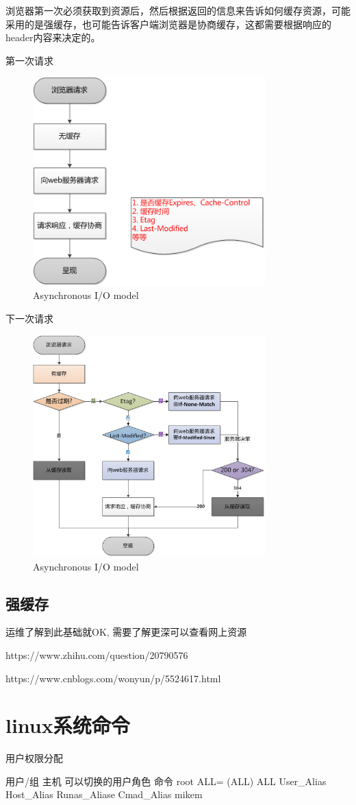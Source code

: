 浏览器第一次必须获取到资源后，然后根据返回的信息来告诉如何缓存资源，可能采用的是强缓存，也可能告诉客户端浏览器是协商缓存，这都需要根据响应的header内容来决定的。

第一次请求

\begin{figure}[!ht]
    \centering    
     \caption{\label{Fig:async} Asynchronous I/O model}
    \includegraphics[width=0.8\textwidth]{./images/firstRequest.png}  
\end{figure}

下一次请求

\begin{figure}[!ht]
    \centering    
     \caption{\label{Fig:async} Asynchronous I/O model}
    \includegraphics[width=0.8\textwidth]{./images/nextRequest.png}  
\end{figure}

\subsection{强缓存}

运维了解到此基础就OK, 需要了解更深可以查看网上资源

https://www.zhihu.com/question/20790576

https://www.cnblogs.com/wonyun/p/5524617.html

\section{linux系统命令}

用户权限分配

用户/组   主机    可以切换的用户角色	命令
root     ALL=     (ALL)			ALL
User_Alias  Host_Alias    Runas_Aliase  Cmad_Alias  
mikem

